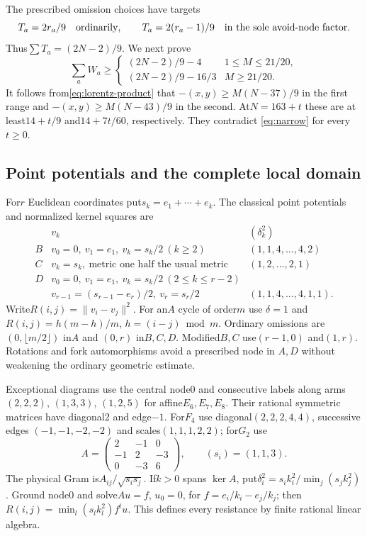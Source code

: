 \documentclass[11pt]{article}
\theoremstyle{remark}\newtheorem{remark}[theorem]{Remark}
\begin{document}
The prescribed omission choices have targets
\[
 T_a=2r_a/9\quad\hbox{ordinarily},\qquad
 T_a=2(r_a-1)/9\quad\hbox{in the sole avoid-node factor}.
\]
Thus$\sum T_a=(2N-2)/9$. We next prove
\begin{equation}\label{eq:two-range}
 \sum_aW_a\ge
 \begin{cases}(2N-2)/9-4&1\le M\le21/20,\\
 (2N-2)/9-16/3&M\ge21/20.
 \end{cases}
\end{equation}
It follows from\eqref{eq:lorentz-product} that
$-(x,y)\ge M(N-37)/9$ in the first range and
$-(x,y)\ge M(N-43)/9$ in the second. At$N=163+t$ these are at
least$14+t/9$ and$14+7t/60$, respectively. They contradict
\eqref{eq:narrow} for every$t\ge0$.

\subsection{Point potentials and the complete local domain}

For$r$ Euclidean coordinates put$s_k=e_1+\cdots+e_k$. The
classical point potentials and normalized kernel squares are
\[
\begin{array}{c|l|l}
 &v_k&(\delta_k^2)\\\hline
B&v_0=0,\ v_1=e_1,\ v_k=s_k/2\ (k\ge2)&(1,1,4,\ldots,4,2)\\
C&v_k=s_k,\ \text{metric one half the usual metric}&(1,2,\ldots,2,1)\\
D&v_0=0,\ v_1=e_1,\ v_k=s_k/2\ (2\le k\le r-2)&\\[-2pt]
 &v_{r-1}=(s_{r-1}-e_r)/2,\ v_r=s_r/2&(1,1,4,\ldots,4,1,1).
\end{array}
\]
Write$R(i,j)=\|v_i-v_j\|^2$. For an$A$ cycle of order$m$ use
$\delta=1$ and$R(i,j)=h(m-h)/m$, $h=(i-j)\bmod m$.
Ordinary omissions are$(0,\lfloor m/2\rfloor)$ in$A$ and
$(0,r)$ in$B,C,D$. Modified$B,C$ use$(r-1,0)$ and$(1,r)$.
Rotations and fork automorphisms avoid a prescribed node in
$A,D$ without weakening the ordinary geometric estimate.

Exceptional diagrams use the central node0 and consecutive labels
along arms$(2,2,2)$, $(1,3,3)$, $(1,2,5)$ for affine$E_6,E_7,E_8$.
Their rational symmetric matrices have diagonal2 and edge$-1$.
For$F_4$ use diagonal$(2,2,2,4,4)$, successive edges
$(-1,-1,-2,-2)$ and scales$(1,1,1,2,2)$; for$G_2$ use
\[
 A=\begin{pmatrix}2&-1&0\\-1&2&-3\\0&-3&6\end{pmatrix},
 \qquad(s_i)=(1,1,3).
\]
The physical Gram is$A_{ij}/\sqrt{s_is_j}$. If$k>0$ spans
$\ker A$, put$\delta_i^2=s_ik_i^2/\min_j(s_jk_j^2)$.
Ground node0 and solve$Au=f$, $u_0=0$, for
$f=e_i/k_i-e_j/k_j$; then
$R(i,j)=\min_l(s_lk_l^2)f^tu$. This defines every resistance
by finite rational linear algebra.
\end{document}
